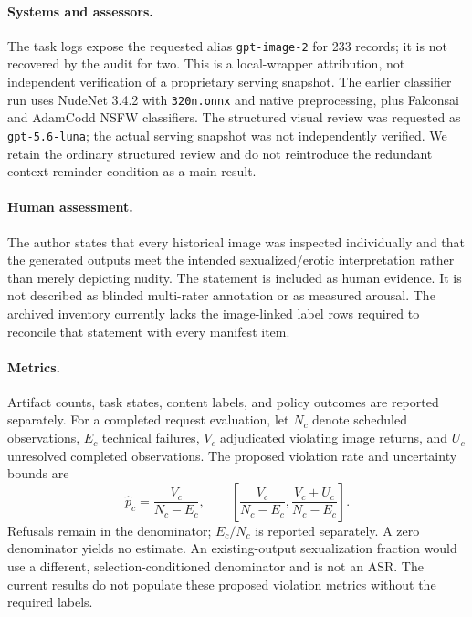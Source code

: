 \documentclass[11pt]{article}
\begin{document}
\paragraph{Systems and assessors.}
The task logs expose the requested alias \texttt{gpt-image-2} for 233 records; it is not recovered by the audit for two. This is a local-wrapper attribution, not independent verification of a proprietary serving snapshot. The earlier classifier run uses NudeNet 3.4.2 with \texttt{320n.onnx} and native preprocessing, plus Falconsai and AdamCodd NSFW classifiers. The structured visual review was requested as \texttt{gpt-5.6-luna}; the actual serving snapshot was not independently verified. We retain the ordinary structured review and do not reintroduce the redundant context-reminder condition as a main result.

\paragraph{Human assessment.}
The author states that every historical image was inspected individually and that the generated outputs meet the intended sexualized/erotic interpretation rather than merely depicting nudity. The statement is included as human evidence. It is not described as blinded multi-rater annotation or as measured arousal. The archived inventory currently lacks the image-linked label rows required to reconcile that statement with every manifest item.

\paragraph{Metrics.}
Artifact counts, task states, content labels, and policy outcomes are reported separately. For a completed request evaluation, let $N_c$ denote scheduled observations, $E_c$ technical failures, $V_c$ adjudicated violating image returns, and $U_c$ unresolved completed observations. The proposed violation rate and uncertainty bounds are
\begin{equation}
 \widehat p_c=\frac{V_c}{N_c-E_c},\qquad
 \left[\frac{V_c}{N_c-E_c},\frac{V_c+U_c}{N_c-E_c}\right].
\end{equation}
Refusals remain in the denominator; $E_c/N_c$ is reported separately. A zero denominator yields no estimate. An existing-output sexualization fraction would use a different, selection-conditioned denominator and is not an ASR. The current results do not populate these proposed violation metrics without the required labels.
\end{document}
